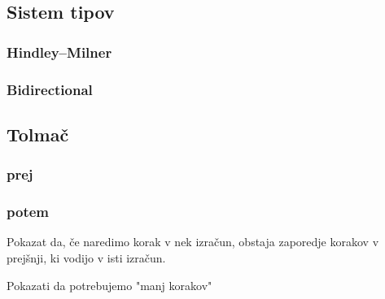 \documentclass[12pt,a4paper,twoside]{article}
\newcommand{\literatura}{literatura}  %
\theoremstyle{definition} %
\theoremstyle{plain} %
\numberwithin{equation}{section}  %
\begin{document}
\subsection{Sistem tipov}\label{sec:tipi}

\subsubsection{Hindley–Milner}

\subsubsection{Bidirectional}


\subsection{Tolmač}\label{sec:interpreter}

\subsubsection{prej}

\subsubsection{potem}

Pokazat da, če naredimo korak v nek izračun, obstaja zaporedje korakov v prejšnji, ki vodijo v isti izračun.

Pokazati da potrebujemo "manj korakov" 




\cleardoublepage                           %

\cleardoublepage                           %
\printindex
\end{document}
